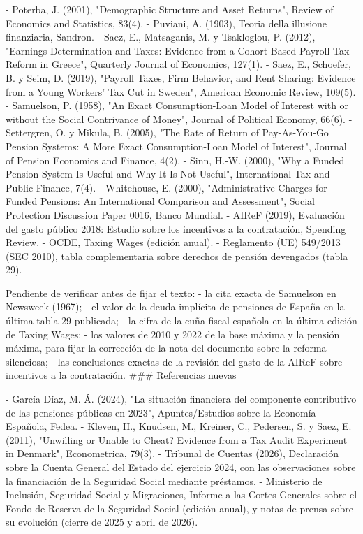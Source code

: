 \documentclass[10pt,a4paper]{article}
\begin{document}
- Poterba, J. (2001), "Demographic Structure and Asset Returns", Review of Economics and Statistics, 83(4).
- Puviani, A. (1903), Teoria della illusione finanziaria, Sandron.
- Saez, E., Matsaganis, M. y Tsakloglou, P. (2012), "Earnings Determination and Taxes: Evidence from a Cohort-Based Payroll Tax Reform in Greece", Quarterly Journal of Economics, 127(1).
- Saez, E., Schoefer, B. y Seim, D. (2019), "Payroll Taxes, Firm Behavior, and Rent Sharing: Evidence from a Young Workers' Tax Cut in Sweden", American Economic Review, 109(5).
- Samuelson, P. (1958), "An Exact Consumption-Loan Model of Interest with or without the Social Contrivance of Money", Journal of Political Economy, 66(6).
- Settergren, O. y Mikula, B. (2005), "The Rate of Return of Pay-As-You-Go Pension Systems: A More Exact Consumption-Loan Model of Interest", Journal of Pension Economics and Finance, 4(2).
- Sinn, H.-W. (2000), "Why a Funded Pension System Is Useful and Why It Is Not Useful", International Tax and Public Finance, 7(4).
- Whitehouse, E. (2000), "Administrative Charges for Funded Pensions: An International Comparison and Assessment", Social Protection Discussion Paper 0016, Banco Mundial.
- AIReF (2019), Evaluación del gasto público 2018: Estudio sobre los incentivos a la contratación, Spending Review.
- OCDE, Taxing Wages (edición anual).
- Reglamento (UE) 549/2013 (SEC 2010), tabla complementaria sobre derechos de pensión devengados (tabla 29).

Pendiente de verificar antes de fijar el texto:
- la cita exacta de Samuelson en Newsweek (1967);
- el valor de la deuda implícita de pensiones de España en la última tabla 29 publicada;
- la cifra de la cuña fiscal española en la última edición de Taxing Wages;
- los valores de 2010 y 2022 de la base máxima y la pensión máxima, para fijar la corrección de la nota del documento sobre la reforma silenciosa;
- las conclusiones exactas de la revisión del gasto de la AIReF sobre incentivos a la contratación.
### Referencias nuevas

- García Díaz, M. Á. (2024), "La situación financiera del componente contributivo de las pensiones públicas en 2023", Apuntes/Estudios sobre la Economía Española, Fedea.
- Kleven, H., Knudsen, M., Kreiner, C., Pedersen, S. y Saez, E. (2011), "Unwilling or Unable to Cheat? Evidence from a Tax Audit Experiment in Denmark", Econometrica, 79(3).
- Tribunal de Cuentas (2026), Declaración sobre la Cuenta General del Estado del ejercicio 2024, con las observaciones sobre la financiación de la Seguridad Social mediante préstamos.
- Ministerio de Inclusión, Seguridad Social y Migraciones, Informe a las Cortes Generales sobre el Fondo de Reserva de la Seguridad Social (edición anual), y notas de prensa sobre su evolución (cierre de 2025 y abril de 2026).
\end{document}

